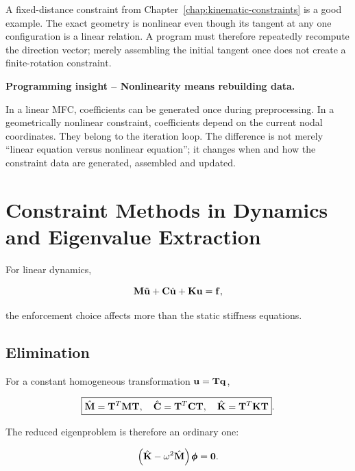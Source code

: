 A fixed-distance constraint from Chapter~\ref{chap:kinematic-constraints} is a
good example. The exact geometry is nonlinear even though its tangent at any
one configuration is a linear relation. A program must therefore repeatedly
recompute the direction vector; merely assembling the initial tangent once does
not create a finite-rotation constraint.

\begin{bbox}
\textbf{Programming insight -- Nonlinearity means rebuilding data.}

In a linear MFC, coefficients can be generated once during preprocessing. In a
geometrically nonlinear constraint, coefficients depend on the current nodal
coordinates. They belong to the iteration loop. The difference is not merely
``linear equation versus nonlinear equation''; it changes when and how the
constraint data are generated, assembled and updated.
\end{bbox}

\section{Constraint Methods in Dynamics and Eigenvalue Extraction}\label{sec:mfc-dynamics}

For linear dynamics,

\begin{equation}
    \mathbf{M}\ddot{\mathbf{u}}+
    \mathbf{C}\dot{\mathbf{u}}+
    \mathbf{K}\mathbf{u}=\mathbf{f},
\end{equation}

the enforcement choice affects more than the static stiffness equations.

\subsection{Elimination}

For a constant homogeneous transformation $\mathbf{u}=\mathbf{T}\mathbf{q}$,

\begin{equation}
\boxed{
\hat{\mathbf{M}}=\mathbf{T}^T\mathbf{M}\mathbf{T},\quad
\hat{\mathbf{C}}=\mathbf{T}^T\mathbf{C}\mathbf{T},\quad
\hat{\mathbf{K}}=\mathbf{T}^T\mathbf{K}\mathbf{T}
}.
\end{equation}

The reduced eigenproblem is therefore an ordinary one:

\begin{equation}
    \left(\hat{\mathbf{K}}-\omega^2\hat{\mathbf{M}}\right)\pmb{\phi}=\mathbf{0}.
\end{equation}

